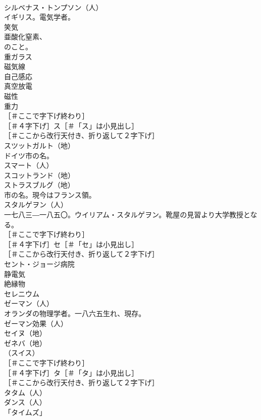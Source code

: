 \documentclass[8pt]{extreport}
\begin{document}
\begin{CJK}{UTF8}{min}
\\	シルベナス・トンプソン（人）
\\	イギリス。電気学者。
\\	笑気 
\\	亜酸化窒素、
\\	のこと。
\\	重ガラス 
\\	磁気線 
\\	自己感応 
\\	真空放電 
\\	磁性 
\\	重力 
\\	［＃ここで字下げ終わり］
\\	［＃４字下げ］ス［＃「ス」は小見出し］
\\	［＃ここから改行天付き、折り返して２字下げ］
\\	スツットガルト（地）
\\	ドイツ市の名。
\\	スマート（人）
\\	スコットランド（地）
\\	ストラスブルグ（地）
\\	市の名。現今はフランス領。
\\	スタルゲヲン（人）
\\	一七八三―一八五〇。ウイリアム・スタルゲヲン。靴屋の見習より大学教授となる。
\\	［＃ここで字下げ終わり］
\\	［＃４字下げ］セ［＃「セ」は小見出し］
\\	［＃ここから改行天付き、折り返して２字下げ］
\\	セント・ジョージ病院 
\\	静電気 
\\	絶縁物 
\\	セレニウム 
\\	ゼーマン（人）
\\	オランダの物理学者。一八六五生れ、現存。
\\	ゼーマン効果（人）
\\	セイヌ（地）
\\	ゼネバ（地）
\\	（スイス）
\\	［＃ここで字下げ終わり］
\\	［＃４字下げ］タ［＃「タ」は小見出し］
\\	［＃ここから改行天付き、折り返して２字下げ］
\\	タタム（人）
\\	ダンス（人）
\\	「タイムズ」 

\end{CJK}
\end{document}
